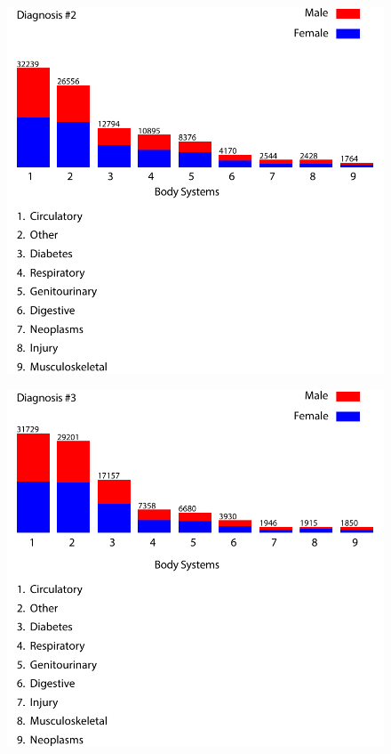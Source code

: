 \documentclass{neu_handout}
\begin{document}
\begin{figure}[H]
\centering
\includegraphics[width=0.60\linewidth]{Diag_2.pdf}
\end{figure}

\begin{figure}[H]
\centering
\includegraphics[width=0.60\linewidth]{Diag_3.pdf}
\end{figure}
\end{document}
